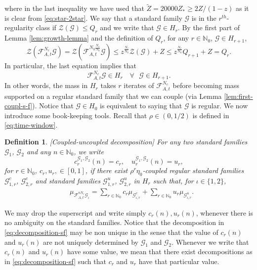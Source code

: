 \documentclass{amsart}
\numberwithin{equation}{section}
\newtheorem{definition}[theorem]{Definition}
\renewcommand{\ge}{\geqslant}
\renewcommand{\le}{\leqslant}
\newcommand\cF{{\mathcal F}}
\newcommand\cG{{\mathcal G}}
\newcommand\cZ{{\mathcal Z}}
\newcommand\bN{{\mathbb N}}
\newcommand{\catt}{\cF_{A,t}}
\begin{document}
where in the last inequality we have used that \(\widetilde Z = 20000Z_{*} \ge 2Z/(1-z)\) as it is clear from \eqref{eq:star-2star}. We say that a standard family \(\cG\) is in the \(r^{th}\)-regularity class if \(\cZ(\cG) \le Q_{r}\) and we write that \(\cG \in H_{r}\). By the first part of Lemma \ref{lem:growth-lemma} and the definition of \(Q_r\), for any \(r \in \bN_0\), \(\cG \in H_{r+1}\),
\[
\cZ (  \catt^{N_c} \cG ) = \cZ( \catt^{N_0\frac{N_c}{N_0}} \cG) \le z^{\frac{N_c}{N_0}} \cZ (\cG) + Z \le z^{\frac{N_c}{N_0}} Q_{r+1} + Z = Q_{r}.
\]
In particular, the last equation implies that
\begin{equation} \label{eq:regularity-one-time}
   \catt^{N_c} \cG \in H_{r} \quad \forall \text{ }\cG \in H_{r+1}.
\end{equation}
In other words, the mass in \(H_{r}\) takes \(r\) iterates of \(\catt^{N_c}\) before becoming mass supported on a regular standard family that we can couple (via Lemma \ref{lem:first-coupl-s-f}). Notice that \(\cG \in H_0\) is equivalent to saying that \(\cG\) is regular. We now introduce some book-keeping tools. Recall that \(\rho \in (0,1/2)\) is defined in \eqref{eq:time-window}.
\begin{definition}\label{def:ckuk}[Coupled-uncoupled decomposition]
For any two standard families \(\cG_1\), \(\cG_2\) and any \(n \in \bN_0\), we write 
\[
  c_{r}^{\cG_1, \cG_2} (n) = c_r, \quad  u_{r}^{\cG_1, \cG_2}(n) = u_r,
\]
for \(r \in \bN_0\), \(c_r, u_r, \in [0,1]\), if there exist \(\rho^{r}\eta_0\)-coupled regular standard families \(\cG_{1,r}^c\), \(\cG_{2,r}^c\) and standard families \(\cG_{1,r}^u\), \(\cG_{2,r}^u\) in \(H_r\) such that, for \(\iota \in \{1,2\}\),
\begin{equation}\label{eq:decomposition-sf}
\begin{split}
   &\mu_{\catt^{nN_c}\cG_\iota} = \sum_{r \in \bN_0} c_r \mu_{\cG_{\iota,r}^c} + \sum_{r \in \bN_0}u_r\mu_{\cG_{\iota,r}^u}.
\end{split}
\end{equation}
\end{definition}
We may drop the superscript and write simply \(c_r(n), u_r(n)\), whenever there is no ambiguity on the standard families. Notice that the decomposition in \eqref{eq:decomposition-sf} may be non unique in the sense that the value of \(c_{r}(n)\) and \(u_{r}(n)\) are not uniquely determined by \(\cG_1\) and \(\cG_2\). Whenever we write that \(c_{r}(n)\) and \(u_{r}(n)\) have some value, we mean that there exist decompositions as in \eqref{eq:decomposition-sf} such that \(c_{r}\) and \(u_{r}\) have that particular value. 
\end{document}
